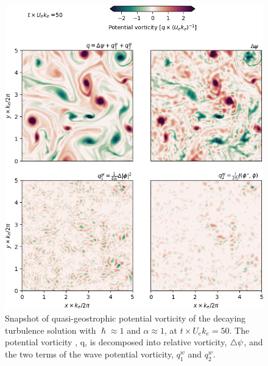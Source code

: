 \documentclass{jfm}
\begin{document}
 \begin{figure}
 \label{pv-terms_turb}
 \centering
 \includegraphics[width=.9\textwidth]{figs/fig5.png}
 \caption{Snapshot of quasi-geostrophic potential vorticity
          of the decaying turbulence solution with $\hslash \approx 1$
          and $\alpha \approx 1$, at $t\times U_e k_e = 50$. The potential vorticity
          , q, is decomposed into relative vorticity, $\triangle\psi$,
          and the two terms of the wave potential vorticity, $q^w_1$ and $q^w_2$.
         }
 \end{figure}


 
\end{document}
